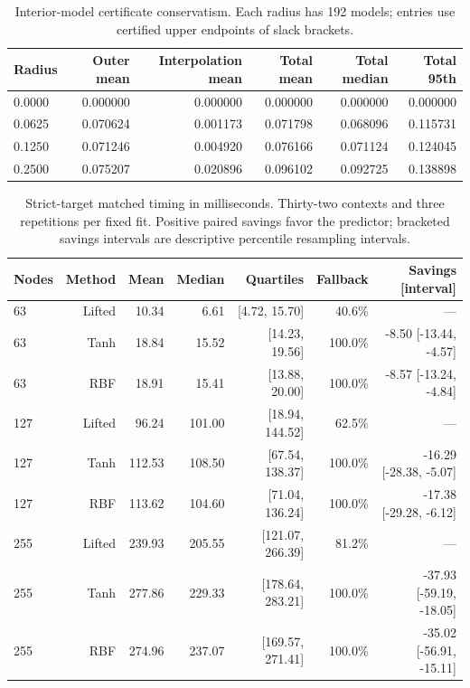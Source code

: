 \begin{table}[tbp]\centering\small\setlength{\tabcolsep}{4pt}
\caption{Interior-model certificate conservatism. Each radius has 192 models; entries use certified upper endpoints of slack brackets.}
\label{tab:r24-tightness}
\begin{tabular}{lrrrrr}
\toprule
Radius & Outer mean & Interpolation mean & Total mean & Total median & Total 95th\\
\midrule
0.0000 & 0.000000 & 0.000000 & 0.000000 & 0.000000 & 0.000000\\
0.0625 & 0.070624 & 0.001173 & 0.071798 & 0.068096 & 0.115731\\
0.1250 & 0.071246 & 0.004920 & 0.076166 & 0.071124 & 0.124045\\
0.2500 & 0.075207 & 0.020896 & 0.096102 & 0.092725 & 0.138898\\
\bottomrule
\end{tabular}
\end{table}

\begin{table}[tbp]\centering\small\setlength{\tabcolsep}{4pt}
\caption{Strict-target matched timing in milliseconds. Thirty-two contexts and three repetitions per fixed fit. Positive paired savings favor the predictor; bracketed savings intervals are descriptive percentile resampling intervals.}
\label{tab:r24-timing}
\begin{tabular}{lrrrrrr}
\toprule
Nodes & Method & Mean & Median & Quartiles & Fallback & Savings [interval]\\
\midrule
63 & Lifted & 10.34 & 6.61 & [4.72, 15.70] & 40.6\% & ---\\
63 & Tanh & 18.84 & 15.52 & [14.23, 19.56] & 100.0\% & -8.50 [-13.44, -4.57]\\
63 & RBF & 18.91 & 15.41 & [13.88, 20.00] & 100.0\% & -8.57 [-13.24, -4.84]\\
127 & Lifted & 96.24 & 101.00 & [18.94, 144.52] & 62.5\% & ---\\
127 & Tanh & 112.53 & 108.50 & [67.54, 138.37] & 100.0\% & -16.29 [-28.38, -5.07]\\
127 & RBF & 113.62 & 104.60 & [71.04, 136.24] & 100.0\% & -17.38 [-29.28, -6.12]\\
255 & Lifted & 239.93 & 205.55 & [121.07, 266.39] & 81.2\% & ---\\
255 & Tanh & 277.86 & 229.33 & [178.64, 283.21] & 100.0\% & -37.93 [-59.19, -18.05]\\
255 & RBF & 274.96 & 237.07 & [169.57, 271.41] & 100.0\% & -35.02 [-56.91, -15.11]\\
\bottomrule
\end{tabular}
\end{table}

